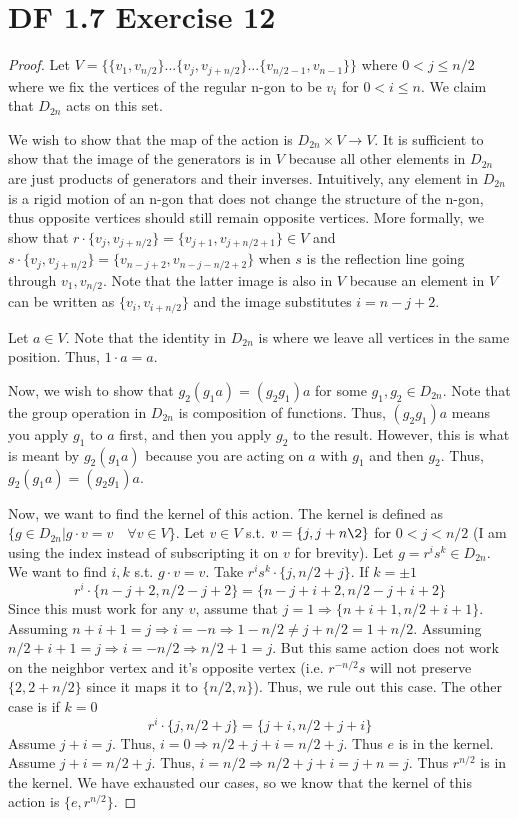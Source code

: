 \documentclass{article}
\begin{document}
\section{DF 1.7 Exercise 12}
\begin{proof}
Let $V = \{\{v_1, v_{n/2}\}...\{v_{j}, v_{j+n/2}\}...\{v_{n/2-1}, v_{n-1}\}\}$ where $0 < j \leq n/2$ where we fix the vertices of the regular n-gon to be $v_i$ for $0 < i \leq n$. We claim that $D_{2n}$ acts on this set.

We wish to show that the map of the action is $D_{2n} \times V \rightarrow V$. It is sufficient to show that the image of the generators is in $V$ because all other elements in $D_{2n}$ are just products of generators and their inverses. Intuitively, any element in $D_{2n}$ is a rigid motion of an n-gon that does not change the structure of the n-gon, thus opposite vertices should still remain opposite vertices. More formally, we show that $r \cdot \{v_{j}, v_{j+n/2}\} = \{v_{j+1}, v_{j+n/2 + 1}\} \in V$ and $s \cdot \{v_{j}, v_{j+n/2}\} = \{v_{n-j+2}, v_{n-j-n/2+2}\}$ when $s$ is the reflection line going through $v_1, v_{n/2}$. Note that the latter image is also in $V$ because an element in $V$ can be written as $\{v_{i}, v_{i+n/2}\}$ and the image substitutes $i=n-j+2$.

Let $a \in V$. Note that the identity in $D_{2n}$ is where we leave all vertices in the same position. Thus, $1 \cdot a = a$.

Now, we wish to show that $g_2(g_1a)=(g_2g_1)a$ for some $g_1, g_2 \in D_{2n}$. Note that the group operation in $D_{2n}$ is composition of functions. Thus, $(g_2g_1)a$ means you apply $g_1$ to $a$ first, and then you apply $g_2$ to the result. However, this is what is meant by $g_2(g_1a)$ because you are acting on $a$ with $g_1$ and then $g_2$. Thus, $g_2(g_1a)=(g_2g_1)a$.

Now, we want to find the kernel of this action. The kernel is defined as $\{g\in D_{2n} | g \cdot v = v \quad \forall v \in V\}$. Let $v \in V$ s.t. $v=\{j, j+n\2\}$ for $0 < j < n/2$ (I am using the index instead of subscripting it on $v$ for brevity). Let $g = r^is^k \in D_{2n}$. We want to find $i, k$ s.t. $g \cdot v = v$. Take $r^is^k \cdot \{j, n/2 + j\}$. If $k = \pm 1$
\[
r^i \cdot \{n-j+2, n/2-j+2\} = \{n-j+i+2, n/2-j+i+2\}
\]
Since this must work for any $v$, assume that $j=1 \Rightarrow \{n+i+1, n/2+i+1\}$. Assuming $n+i+1=j \Rightarrow i=-n \Rightarrow 1-n/2 \neq j+n/2=1+n/2$. Assuming $n/2+i+1=j \Rightarrow i=-n/2 \Rightarrow n/2+1=j$. But this same action does not work on the neighbor vertex and it's opposite vertex (i.e. $r^{-n/2}s$ will not preserve $\{2, 2+n/2\}$ since it maps it to $\{n/2, n\}$). Thus, we rule out this case. The other case is if $k=0$
\[
r^i \cdot \{j, n/2 + j\} = \{j+i, n/2 + j + i\}
\]
Assume $j+i=j$. Thus, $i=0 \Rightarrow n/2+j+i=n/2+j$. Thus $e$ is in the kernel. Assume $j+i=n/2+j$. Thus, $i=n/2 \Rightarrow n/2+j+i=j+n=j$. Thus $r^{n/2}$ is in the kernel. We have exhausted our cases, so we know that the kernel of this action is $\{e, r^{n/2}\}$.
\end{proof}
\end{document}
